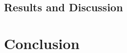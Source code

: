 \documentclass{article}
\begin{document}
\subsection{Results and Discussion}
\label{subsec:results}

\section{Conclusion}
\label{sec:conclusion}




\end{document}
